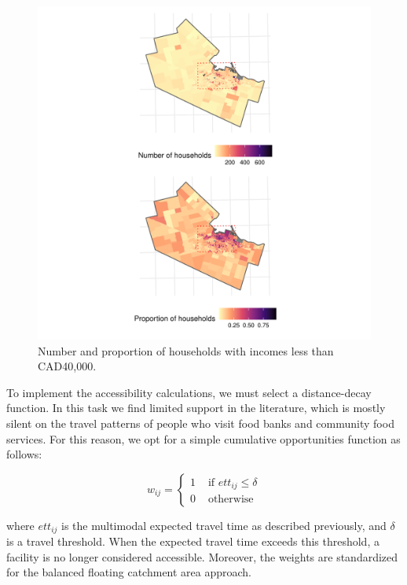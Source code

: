 \documentclass[]{elsarticle} %
\begin{document}
\begin{figure}
\includegraphics[width=1\linewidth]{Accessibility-Foodbanks-Hamilton_files/figure-latex/plot-low-income-households-1} \caption{\label{fig:low-income-households}Number and proportion of households with incomes less than CAD40,000.}\label{fig:plot-low-income-households}
\end{figure}

To implement the accessibility calculations, we must select a
distance-decay function. In this task we find limited support in the
literature, which is mostly silent on the travel patterns of people who
visit food banks and community food services. For this reason, we opt
for a simple cumulative opportunities function as follows:

\[
w_{ij}=
\begin{cases}
1 & \text{ if } ett_{ij}\le \delta\\
0 & \text{ otherwise}
\end{cases}
\]

\noindent where \(ett_{ij}\) is the multimodal expected travel time as
described previously, and \(\delta\) is a travel threshold. When the
expected travel time exceeds this threshold, a facility is no longer
considered accessible. Moreover, the weights are standardized for the
balanced floating catchment area approach.
\end{document}

